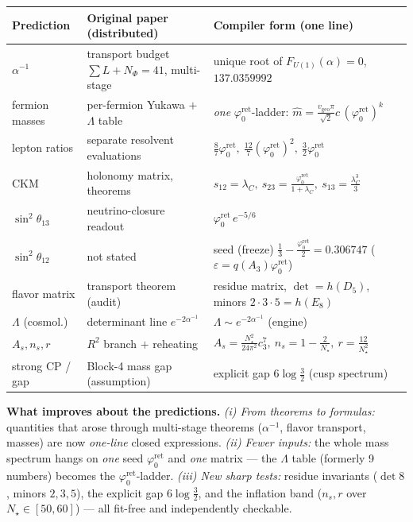 \documentclass[11pt,a4paper]{article}
\newcommand{\phiz}{\varphi_0^{\mathrm{ret}}}
\newcommand{\vgeo}{v_{\mathrm{geo}}}
\theoremstyle{definition}
\renewcommand{\arraystretch}{1.15}
\begin{document}
\begin{center}\small
\renewcommand{\arraystretch}{1.25}
\begin{tabularx}{\linewidth}{@{}p{3.2cm}p{4.4cm}Y@{}}
\toprule
\textbf{Prediction} & \textbf{Original paper (distributed)} & \textbf{Compiler form (one line)} \\
\midrule
$\alpha^{-1}$ & transport budget $\sum L{+}N_\Phi{=}41$, multi-stage & unique root of $F_{U(1)}(\alpha){=}0$, $137.0359992$ \\
fermion masses & per-fermion Yukawa $+$ $\Lambda$ table & \emph{one} $\phiz$-ladder: $\hat m{=}\tfrac{\vgeo\pi}{\sqrt2}c\,(\phiz)^{k}$ \\
lepton ratios & separate resolvent evaluations & $\tfrac87\phiz,\ \tfrac{12}7(\phiz)^2,\ \tfrac32\phiz$ \\
CKM & holonomy matrix, theorems & $s_{12}{=}\lambda_C,\ s_{23}{=}\tfrac{\phiz}{1+\lambda_C},\ s_{13}{=}\tfrac{\lambda_C^3}3$ \\
$\sin^2\theta_{13}$ & neutrino-closure readout & $\phiz\,e^{-5/6}$ \\
$\sin^2\theta_{12}$ & not stated & seed (freeze) $\tfrac13-\tfrac{\phiz}{2}{=}0.306747$ ($\varepsilon{=}q(A_3)\phiz$) \\
flavor matrix & transport theorem (audit) & residue matrix, $\det{=}h(D_5)$, minors $2{\cdot}3{\cdot}5{=}h(E_8)$ \\
$\Lambda$ (cosmol.) & determinant line $e^{-2\alpha^{-1}}$ & $\Lambda\sim e^{-2\alpha^{-1}}$ (engine) \\
$A_s,n_s,r$ & $R^2$ branch $+$ reheating & $A_s{=}\tfrac{N_\star^2}{24\pi^2}c_3^7,\ n_s{=}1{-}\tfrac2{N_\star},\ r{=}\tfrac{12}{N_\star^2}$ \\
strong CP / gap & Block-4 mass gap (assumption) & explicit gap $6\log\tfrac32$ (cusp spectrum) \\
\bottomrule
\end{tabularx}
\end{center}

\par\smallskip\noindent\textbf{What improves about the predictions.}
\emph{(i) From theorems to formulas:} quantities that arose through multi-stage theorems
($\alpha^{-1}$, flavor transport, masses) are now \emph{one-line} closed expressions.
\emph{(ii) Fewer inputs:} the whole mass spectrum hangs on \emph{one} seed $\phiz$ and \emph{one}
matrix --- the $\Lambda$ table (formerly 9 numbers) becomes the $\phiz$-ladder.
\emph{(iii) New sharp tests:} residue invariants ($\det 8$, minors $2{,}3{,}5$), the explicit gap
$6\log\tfrac32$, and the inflation band ($n_s,r$ over $N_\star\in[50,60]$) --- all fit-free and
independently checkable.
\end{document}
